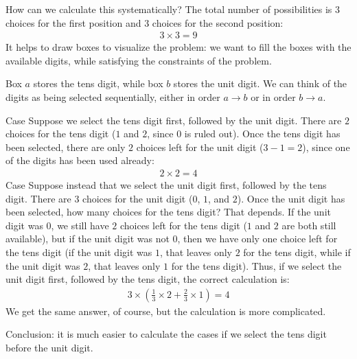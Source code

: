 \documentclass[12pt]{article}
\begin{document}
How can we calculate this systematically? The total number of possibilities is $3$ choices for the first position and $3$ choices for the second position:
\begin{align*}
3 \times 3 = 9
\end{align*}
It helps to draw boxes to visualize the problem: we want to fill the boxes with the available digits, while satisfying the constraints of the problem.
\begin{center}
\end{center}
Box $a$ stores the tens digit, while box $b$ stores the unit digit. We can think of the digits as being selected sequentially, either in order $a \rightarrow b$ or in order $b \rightarrow a$.

Case  Suppose we select the tens digit first, followed by the unit digit. There are $2$ choices for the tens digit ($1$ and $2$, since $0$ is ruled out). Once the tens digit has been selected, there are only $2$ choices left for the unit digit ($3-1=2$), since one of the digits has been used already:
\begin{align*}
2 \times 2 = 4
\end{align*}
Case  Suppose instead that we select the unit digit first, followed by the tens digit. There are $3$ choices for the unit digit ($0$, $1$, and $2$). Once the unit digit has been selected, how many choices for the tens digit? That depends. If the unit digit was $0$, we still have $2$ choices left for the tens digit ($1$ and $2$ are both still available), but if the unit digit was not $0$, then we have only one choice left for the tens digit (if the unit digit was $1$, that leaves only $2$ for the tens digit, while if the unit digit was $2$, that leaves only $1$ for the tens digit). Thus, if we select the unit digit first, followed by the tens digit, the correct calculation is:
\begin{align*}
3 \times \left(\frac{1}{3}\times2 + \frac{2}{3}\times1\right)
= 4
\end{align*}
We get the same answer, of course, but the calculation is more complicated.

Conclusion: it is much easier to calculate the cases if we select the tens digit before the unit digit. 
\end{document}
